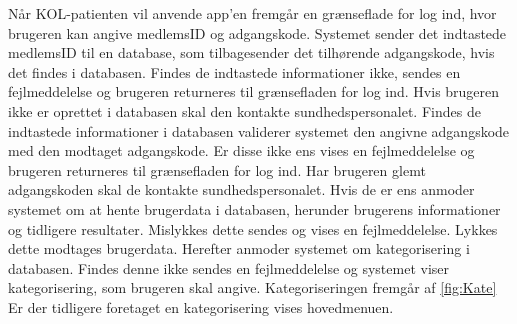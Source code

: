 \noindent
Når KOL-patienten vil anvende app'en fremgår en grænseflade for log ind, hvor brugeren kan angive medlemsID og adgangskode. Systemet sender det indtastede medlemsID til en database, som tilbagesender det tilhørende adgangskode, hvis det findes i databasen. Findes de indtastede informationer ikke, sendes en fejlmeddelelse og brugeren returneres til grænsefladen for log ind. Hvis brugeren ikke er oprettet i databasen skal den kontakte sundhedspersonalet. 
Findes de indtastede informationer i databasen validerer systemet den angivne adgangskode med den modtaget adgangskode. Er disse ikke ens vises en fejlmeddelelse og brugeren returneres til grænsefladen for log ind. Har brugeren glemt adgangskoden skal de kontakte sundhedspersonalet. Hvis de er ens anmoder systemet om at hente brugerdata i databasen, herunder brugerens informationer og tidligere resultater. Mislykkes dette sendes og vises en fejlmeddelelse. Lykkes dette modtages brugerdata.
Herefter anmoder systemet om kategorisering i databasen. Findes denne ikke sendes en fejlmeddelelse og systemet viser kategorisering, som brugeren skal angive. Kategoriseringen fremgår af \autoref{fig:Kate} Er der tidligere foretaget en kategorisering vises hovedmenuen.

   


